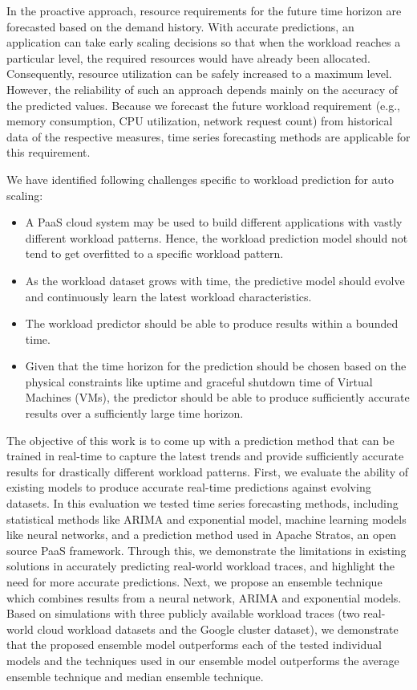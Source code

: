 In the proactive approach, resource requirements for the future time horizon are forecasted based on the demand history. With accurate predictions, an application can take early scaling decisions so that when the workload reaches a particular level, the required resources would have already been allocated. Consequently, resource utilization can be safely increased to a maximum level. However, the reliability of such an approach depends mainly on the accuracy of the predicted values. Because we forecast the future workload requirement (e.g., memory consumption, CPU utilization, network request count) from historical data of the respective measures, time series forecasting methods are applicable for this requirement.

We have identified following challenges specific to workload prediction for auto scaling:
\begin{itemize}
\item A PaaS cloud system may be used to build different applications with vastly different workload patterns. Hence, the workload prediction model should not tend to get overfitted to a specific workload pattern.
\item As the workload dataset grows with time, the predictive model should evolve and continuously learn the latest workload characteristics.
\item The workload predictor should be able to produce results within a bounded time.
\item Given that the time horizon for the prediction should be chosen based on the physical constraints like uptime and graceful shutdown time of Virtual Machines (VMs), the predictor should be able to produce sufficiently accurate results over a sufficiently large time horizon.
\end{itemize}

The objective of this work is to come up with a prediction method that can be trained in real-time to capture the latest trends and provide sufficiently accurate results for drastically different workload patterns. First, we evaluate the ability of existing models to produce accurate real-time predictions against evolving datasets. In this evaluation we tested time series forecasting methods, including statistical methods like ARIMA and exponential model, machine learning models like neural networks, and a prediction method used in Apache Stratos, an open source PaaS framework. Through this, we demonstrate the limitations in existing solutions in accurately predicting real-world workload traces, and highlight the need for more accurate predictions. Next, we propose an ensemble technique which combines results from a neural network, ARIMA and exponential models. Based on simulations with three publicly available workload traces (two real-world cloud workload datasets and the Google cluster dataset), we demonstrate that the proposed ensemble model outperforms each of the tested individual models and the techniques used in our ensemble model outperforms the average ensemble technique and median ensemble technique.

